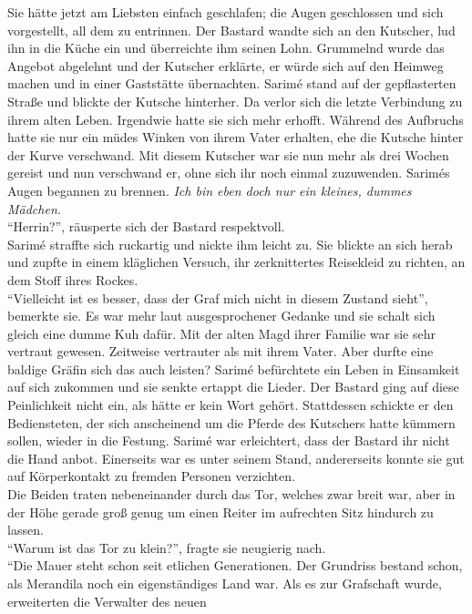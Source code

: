 Sie hätte jetzt am Liebsten einfach geschlafen; die Augen geschlossen und sich vorgestellt, all dem 
zu entrinnen. Der Bastard wandte sich an den Kutscher, lud ihn in die Küche ein und überreichte ihm 
seinen Lohn. Grummelnd wurde das Angebot abgelehnt und der Kutscher erklärte, er würde sich auf den 
Heimweg machen und in einer Gaststätte übernachten. Sarimé stand auf der gepflasterten Straße und 
blickte der Kutsche hinterher. Da verlor sich die letzte Verbindung zu ihrem alten Leben. Irgendwie 
hatte sie sich mehr erhofft. Während des Aufbruchs hatte sie nur ein müdes Winken von ihrem Vater 
erhalten, ehe die Kutsche hinter der Kurve verschwand. Mit diesem Kutscher war sie nun mehr als 
drei Wochen gereist und nun verschwand er, ohne sich ihr noch einmal zuzuwenden. Sarimés Augen 
begannen zu brennen. \textit{Ich bin eben doch nur ein kleines, dummes Mädchen.}\\
``Herrin?'', räusperte sich der Bastard respektvoll. \\
Sarimé straffte sich ruckartig und nickte ihm leicht zu. Sie blickte an sich herab und zupfte in 
einem kläglichen Versuch, ihr zerknittertes Reisekleid zu richten, an dem Stoff ihres Rockes. \\
``Vielleicht ist es besser, dass der Graf mich nicht in diesem Zustand sieht'', bemerkte sie. Es 
war mehr laut ausgesprochener Gedanke und sie schalt sich gleich eine dumme Kuh dafür. Mit der 
alten Magd ihrer Familie war sie sehr vertraut gewesen. Zeitweise vertrauter als mit ihrem Vater. 
Aber durfte eine baldige Gräfin sich das auch leisten? Sarimé befürchtete ein Leben in Einsamkeit 
auf sich zukommen und sie senkte ertappt die Lieder. Der Bastard ging auf diese Peinlichkeit nicht 
ein, als hätte er kein Wort gehört. Stattdessen schickte er den Bediensteten, der sich anscheinend 
um die Pferde des Kutschers hatte kümmern sollen, wieder in die Festung. Sarimé war erleichtert, 
dass der Bastard ihr nicht die Hand anbot. Einerseits war es unter seinem Stand, andererseits konnte 
sie gut auf Körperkontakt zu fremden Personen verzichten.\\
Die Beiden traten nebeneinander durch das Tor, welches zwar breit war, aber in der Höhe gerade groß 
genug um einen Reiter im aufrechten Sitz hindurch zu lassen.\\
``Warum ist das Tor zu klein?'', fragte sie neugierig nach.\\
``Die Mauer steht schon seit etlichen Generationen. Der Grundriss bestand schon, als Merandila noch 
ein eigenständiges Land war. Als es zur Grafschaft wurde, erweiterten die Verwalter des neuen 

